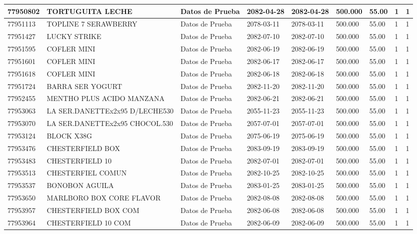 \documentclass[a4paper,12pt]{article}
\begin{document}
\begin{landscape}
\begin{longtable}{|p{4cm}|p{2.5cm}|p{2.5cm}|p{1.8cm}|p{1.8cm}|p{1cm}|p{1cm}|p{3cm}|p{3cm}||}
77950802 & TORTUGUITA LECHE & Datos de Prueba & 2082-04-28 & 2082-04-28 & 500.000 & 55.00 & 1 & 1 \\ \hline 
77951113 & TOPLINE 7 SERAWBERRY & Datos de Prueba & 2078-03-11 & 2078-03-11 & 500.000 & 55.00 & 1 & 1 \\ \hline 
77951427 & LUCKY STRIKE & Datos de Prueba & 2082-07-10 & 2082-07-10 & 500.000 & 55.00 & 1 & 1 \\ \hline 
77951595 & COFLER MINI & Datos de Prueba & 2082-06-19 & 2082-06-19 & 500.000 & 55.00 & 1 & 1 \\ \hline 
77951601 & COFLER MINI & Datos de Prueba & 2082-06-17 & 2082-06-17 & 500.000 & 55.00 & 1 & 1 \\ \hline 
77951618 & COFLER MINI & Datos de Prueba & 2082-06-18 & 2082-06-18 & 500.000 & 55.00 & 1 & 1 \\ \hline 
77951724 & BARRA SER YOGURT & Datos de Prueba & 2082-11-20 & 2082-11-20 & 500.000 & 55.00 & 1 & 1 \\ \hline 
77952455 & MENTHO PLUS ACIDO MANZANA & Datos de Prueba & 2082-06-21 & 2082-06-21 & 500.000 & 55.00 & 1 & 1 \\ \hline 
77953063 & LA SER.DANETTEx2x95 D/LECHE530 & Datos de Prueba & 2055-11-23 & 2055-11-23 & 500.000 & 55.00 & 1 & 1 \\ \hline 
77953070 & LA SER.DANETTEx2x95 CHOCOL.530 & Datos de Prueba & 2057-07-01 & 2057-07-01 & 500.000 & 55.00 & 1 & 1 \\ \hline 
77953124 & BLOCK X38G & Datos de Prueba & 2075-06-19 & 2075-06-19 & 500.000 & 55.00 & 1 & 1 \\ \hline 
77953476 & CHESTERFIELD BOX & Datos de Prueba & 2083-09-19 & 2083-09-19 & 500.000 & 55.00 & 1 & 1 \\ \hline 
77953483 & CHESTERFIELD 10 & Datos de Prueba & 2082-07-01 & 2082-07-01 & 500.000 & 55.00 & 1 & 1 \\ \hline 
77953513 & CHESTERFIEL COMUN & Datos de Prueba & 2082-10-25 & 2082-10-25 & 500.000 & 55.00 & 1 & 1 \\ \hline 
77953537 & BONOBON AGUILA & Datos de Prueba & 2083-01-25 & 2083-01-25 & 500.000 & 55.00 & 1 & 1 \\ \hline 
77953650 & MARLBORO BOX CORE FLAVOR & Datos de Prueba & 2082-08-08 & 2082-08-08 & 500.000 & 55.00 & 1 & 1 \\ \hline 
77953957 & CHESTERFIELD BOX COM & Datos de Prueba & 2082-06-08 & 2082-06-08 & 500.000 & 55.00 & 1 & 1 \\ \hline 
77953964 & CHESTERFIELD 10 COM & Datos de Prueba & 2082-06-09 & 2082-06-09 & 500.000 & 55.00 & 1 & 1 \\ \hline 

\end{longtable}
\end{landscape}
\end{document}
